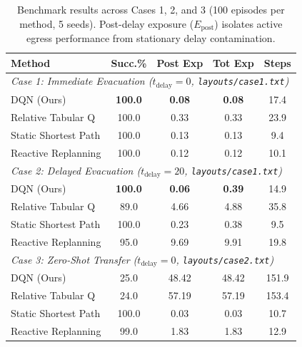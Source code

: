 \documentclass[10pt,twocolumn]{article}
\begin{document}
\begin{table}[t]
\centering\scriptsize
\setlength{\tabcolsep}{2.5pt}
\renewcommand{\arraystretch}{0.88}
\caption{Benchmark results across Cases 1, 2, and 3 (100 episodes per method, 5 seeds). Post-delay exposure ($E_{\mathrm{post}}$) isolates active egress performance from stationary delay contamination.}
\label{tab:results}
\begin{tabular}{lcccc}
\toprule
\textbf{Method} & \textbf{Succ.\%} & \textbf{Post Exp} & \textbf{Tot Exp} & \textbf{Steps} \\
\midrule
\multicolumn{5}{l}{\textit{Case 1: Immediate Evacuation ($t_{\mathrm{delay}}=0$, \texttt{layouts/case1.txt})}} \\
DQN (Ours)           & \textbf{100.0} & \textbf{0.08} & \textbf{0.08} & 17.4 \\
Relative Tabular Q   & 100.0          & 0.33          & 0.33          & 23.9 \\
Static Shortest Path & 100.0          & 0.13          & 0.13          & 9.4  \\
Reactive Replanning  & 100.0          & 0.12          & 0.12          & 10.1 \\
\midrule
\multicolumn{5}{l}{\textit{Case 2: Delayed Evacuation ($t_{\mathrm{delay}}=20$, \texttt{layouts/case1.txt})}} \\
DQN (Ours)           & \textbf{100.0} & \textbf{0.06} & \textbf{0.39} & 14.9 \\
Relative Tabular Q   & 89.0           & 4.66          & 4.88          & 35.8 \\
Static Shortest Path & 100.0          & 0.23          & 0.38          & 9.5  \\
Reactive Replanning  & 95.0           & 9.69          & 9.91          & 19.8 \\
\midrule
\multicolumn{5}{l}{\textit{Case 3: Zero-Shot Transfer ($t_{\mathrm{delay}}=0$, \texttt{layouts/case2.txt})}} \\
DQN (Ours)           & 25.0           & 48.42         & 48.42         & 151.9 \\
Relative Tabular Q   & 24.0           & 57.19         & 57.19         & 153.4 \\
Static Shortest Path & 100.0          & 0.03          & 0.03          & 10.7  \\
Reactive Replanning  & 99.0           & 1.83          & 1.83          & 12.9  \\
\bottomrule
\end{tabular}
\vspace{-0.6em}
\end{table}
\end{document}
